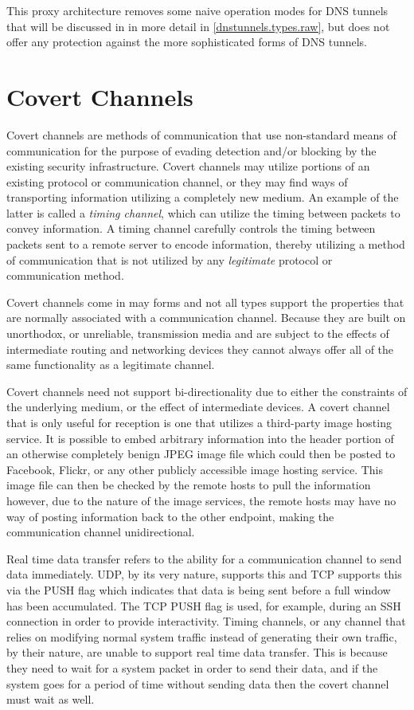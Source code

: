 \documentclass[12pt]{report}
\theoremstyle{remark}
\theoremstyle{definition}
\theoremstyle{definition}
\theoremstyle{definition}
\begin{document}
This proxy architecture removes some naive operation modes for DNS tunnels
that will be discussed in in more detail in \ref{dnstunnels.types.raw}, but does 
not offer any protection against the more sophisticated forms of DNS tunnels.

\section{Covert Channels}

Covert channels are methods of communication that use non-standard means of
communication for the purpose of evading detection and/or blocking by the
existing security infrastructure. Covert channels may utilize
portions of an existing protocol or communication channel, or they may find
ways of transporting information utilizing a completely new medium. An example
of the latter is called a \emph{timing channel}, which can utilize the timing
between packets to convey information. A timing channel carefully controls the
timing between packets sent to a remote server to encode information, thereby
utilizing a method of communication that is not utilized by any
\emph{legitimate} protocol or communication method.

Covert channels come in may forms and not all types support the properties that
are normally associated with a communication channel. Because they are built on
unorthodox, or unreliable, transmission media and are subject to the effects of
intermediate routing and networking devices they cannot always offer all of the
same functionality as a legitimate channel.

Covert channels need not support bi-directionality due
to either the constraints of the underlying medium, or the effect of
intermediate devices. A covert channel that is only useful for reception is one
that utilizes a third-party image hosting service. It is possible to embed
arbitrary information into the header portion of an otherwise completely benign
JPEG image file which could then be posted to Facebook, Flickr, or any other
publicly accessible image hosting service. This image file can then be checked
by the remote
hosts to pull the information however, due to the nature of the image services,
the remote
hosts may have no
way of posting information back to the other endpoint, making the
communication channel unidirectional.

Real time data transfer refers to the ability
for a communication channel to send data immediately. UDP, by its very nature,
supports this and TCP supports this via the PUSH flag which indicates that data
is being sent before a full window has been accumulated. The TCP PUSH flag
is used, for example, during an SSH connection in order to provide
interactivity. Timing channels, or any channel that relies on modifying normal
system traffic instead of generating their own traffic, by their nature, are
unable to support real time data transfer. This is because they need to wait for 
a system packet in order to send their data, and if the system goes for a period 
of time without sending data then the covert channel must wait as well.
\end{document}
